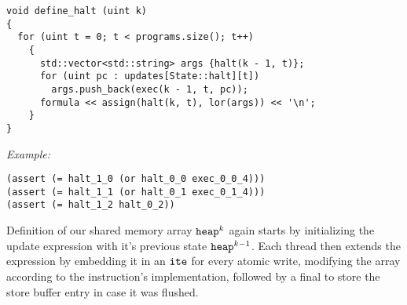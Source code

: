 \newpage

\begin{lstlisting}[style=c++]
void define_halt (uint k)
{
  for (uint t = 0; t < programs.size(); t++)
    {
      std::vector<std::string> args {halt(k - 1, t)};
      for (uint pc : updates[State::halt][t])
        args.push_back(exec(k - 1, t, pc));
      formula << assign(halt(k, t), lor(args)) << '\n';
    }
}
\end{lstlisting}

\noindent
\emph{Example:} 

\begin{lstlisting}[style=smtlib]
(assert (= halt_1_0 (or halt_0_0 exec_0_0_4)))
(assert (= halt_1_1 (or halt_0_1 exec_0_1_4)))
(assert (= halt_1_2 halt_0_2))
\end{lstlisting}


\noindent
Definition of our shared memory array $\texttt{heap}^k$ again starts by initializing the update expression with it's previous state $\texttt{heap}^{k - 1}$.
Each thread then extends the expression by embedding it in an $\texttt{ite}$ for every atomic write, modifying the array according to the instruction's  implementation, followed by a final  to store the store buffer entry in case it was flushed.
%

